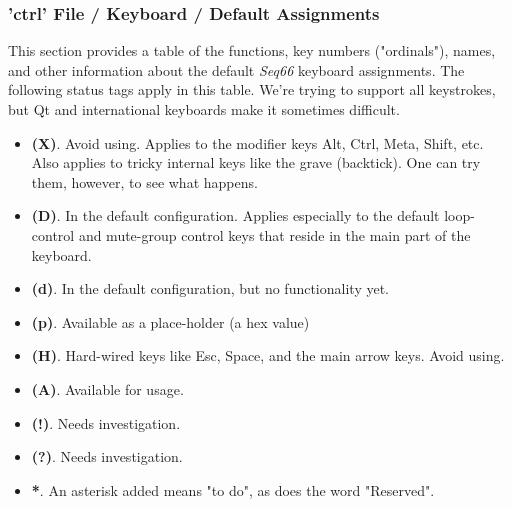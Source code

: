 %
%
%

\subsubsection{'ctrl' File / Keyboard / Default Assignments}
\label{subsubsec:ctrl_keyboard_default_assignments}

   This section provides a table of the functions, key numbers ("ordinals"),
   names, and other information about the default \textsl{Seq66}
   keyboard assignments.
   The following status tags apply in this table.
   We're trying to support all keystrokes, but Qt and international keyboards make
   it sometimes difficult.

   \begin{itemize}
      \item \textbf{(X)}.
         Avoid using.  Applies to the modifier keys Alt, Ctrl, Meta, Shift, etc.
         Also applies to tricky internal keys like the grave (backtick).
         One can try them, however, to see what happens.
      \item \textbf{(D)}.
         In the default configuration. Applies especially to the default
         loop-control and mute-group control keys that reside in the main part of
         the keyboard.
      \item \textbf{(d)}.
         In the default configuration, but no functionality yet.
      \item \textbf{(p)}.
         Available as a place-holder (a hex value)
      \item \textbf{(H)}.
         Hard-wired keys like Esc, Space, and the main arrow keys.  Avoid using.
      \item \textbf{(A)}.
         Available for usage.
      \item \textbf{(!)}.
         Needs investigation.
      \item \textbf{(?)}.
         Needs investigation.
      \item \textbf{*}. An asterisk added means "to do", as does the word
         "Reserved".
   \end{itemize}

